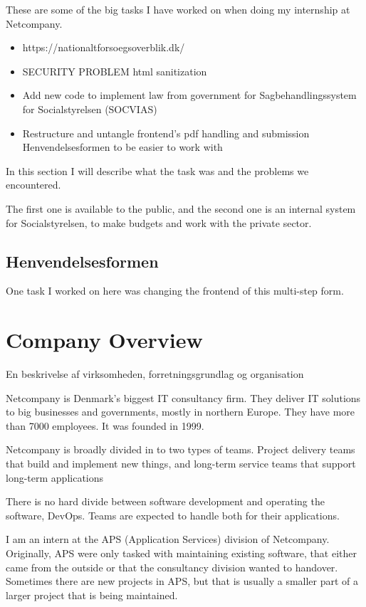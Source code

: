 \documentclass[../main.tex]{subfiles}
\begin{document}

These are some of the big tasks I have worked on when doing my internship at Netcompany.

\begin{itemize}
    \item https://nationaltforsoegsoverblik.dk/ 
    \item SECURITY PROBLEM html sanitization 
    \item Add new code to implement law from government for Sagbehandlingssystem for Socialstyrelsen (SOCVIAS) 
    \item Restructure and untangle frontend's pdf handling and submission Henvendelsesformen to be easier to work with
\end{itemize}

In this section I will describe what the task was and the problems we encountered. 


The first one is available to the public, and the second one is an internal system for Socialstyrelsen, to make budgets and work with the private sector. 

\subsection{Henvendelsesformen}
One task I worked on here was changing the frontend of this multi-step form. 



\section{Company Overview}
En beskrivelse af virksomheden, forretningsgrundlag og organisation 

Netcompany is Denmark's biggest IT consultancy firm.
They deliver IT solutions to big businesses and governments, mostly in northern Europe.
They have more than 7000 employees. It was founded in 1999. 

Netcompany is broadly divided in to two types of teams.
Project delivery teams that build and implement new things, and long-term service teams that support long-term applications

There is no hard divide between software development and operating the software, DevOps. Teams are expected to handle both for their applications. 

I am an intern at the APS (Application Services) division of Netcompany.
Originally, APS were only tasked with maintaining existing software, that either came from the outside or that the consultancy division wanted to handover.
Sometimes there are new projects in APS, but that is usually a smaller part of a larger project that is being maintained.  
\end{document}
